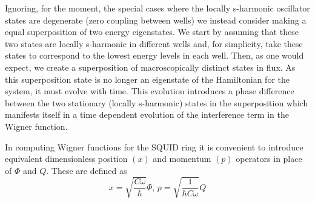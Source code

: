 \documentclass[twocolumn,a4paper,superscriptaddress,showpacs,floatfix,pra]{revtex4}
\begin{document}
Ignoring,  for  the  moment,  the  special  cases  where  the  locally
s-harmonic  oscillator states  are degenerate  (zero  coupling between
wells) we instead consider making  a equal superposition of two energy
eigenstates. We  start by assuming  that these two states  are locally
s-harmonic in  different wells and, for simplicity,  take these states
to correspond to  the lowest energy levels in each  well. Then, as one
would expect,  we create  a superposition of  macroscopically distinct
states in flux. As this superposition state is no longer an eigenstate
of  the Hamiltonian for  the system,  it must  evolve with  time. This
evolution  introduces a  phase difference  between the  two stationary
(locally  s-harmonic)  states  in  the superposition  which  manifests
itself in a  time dependent evolution of the  interference term in the
Wigner function.

In computing Wigner  functions for the SQUID ring  it is convenient to
introduce  equivalent dimensionless  position $\left(  x\right)  $ and
momentum  $\left(  p\right)  $  operators  in place  of  $\Phi  $  and
$Q$. These are defined as
\begin{equation}
x=\sqrt{\frac{C\omega }{\hbar }}\Phi ,\,p=\sqrt{\frac{1}{\hbar C\omega }}Q
\label{posmom}
\end{equation}
\end{document}

